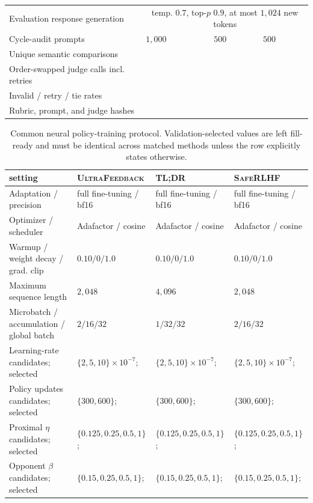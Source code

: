 \documentclass{article}
\theoremstyle{remark}
\theoremstyle{plain}
\newcommand{\pending}{\textemdash}
\begin{document}
\begin{table}[t]
\begin{tabular}{@{}p{}p{}p{}p{}@{}}
Evaluation response generation & \multicolumn{3}{c}{temp. $0.7$, top-$p$ $0.9$, at most $1{,}024$ new tokens}\\
Cycle-audit prompts & $1{,}000$ & $500$ & $500$\\
Unique semantic comparisons & \pending & \pending & \pending\\
Order-swapped judge calls incl. retries & \pending & \pending & \pending\\
Invalid / retry / tie rates & \pending & \pending & \pending\\
Rubric, prompt, and judge hashes & \pending & \pending & \pending\\
\bottomrule
\end{tabular}
\end{table}

\begin{table}[t]
\centering\scriptsize
\setlength{\tabcolsep}{2.2pt}
\caption{Common neural policy-training protocol. Validation-selected values are left fill-ready and must be identical across matched methods unless the row explicitly states otherwise.}
\label{tab:policy-training-hparams}
\begin{tabular}{@{}p{}p{}p{}p{}@{}}
\toprule
setting & \textsc{UltraFeedback} & \textsc{TL;DR} & \textsc{SafeRLHF}\\
\midrule
Adaptation / precision & full fine-tuning / bf16 & full fine-tuning / bf16 & full fine-tuning / bf16\\
Optimizer / scheduler & Adafactor / cosine & Adafactor / cosine & Adafactor / cosine\\
Warmup / weight decay / grad. clip & $0.10/0/1.0$ & $0.10/0/1.0$ & $0.10/0/1.0$\\
Maximum sequence length & $2{,}048$ & $4{,}096$ & $2{,}048$\\
Microbatch / accumulation / global batch & $2/16/32$ & $1/32/32$ & $2/16/32$\\
Learning-rate candidates; selected & $\{2,5,10\}\!\times\!10^{-7}$; \pending & $\{2,5,10\}\!\times\!10^{-7}$; \pending & $\{2,5,10\}\!\times\!10^{-7}$; \pending\\
Policy updates candidates; selected & $\{300,600\}$; \pending & $\{300,600\}$; \pending & $\{300,600\}$; \pending\\
Proximal $\eta$ candidates; selected & $\{0.125,0.25,0.5,1\}$; \pending & $\{0.125,0.25,0.5,1\}$; \pending & $\{0.125,0.25,0.5,1\}$; \pending\\
Opponent $\beta$ candidates; selected & $\{0.15,0.25,0.5,1\}$; \pending & $\{0.15,0.25,0.5,1\}$; \pending & $\{0.15,0.25,0.5,1\}$; \pending\\

\end{tabular}
\end{table}
\end{document}
